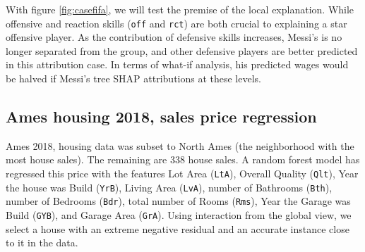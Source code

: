 \documentclass[
]{article}
\begin{document}
With figure \ref{fig:casefifa}, we will test the premise of the local explanation. While offensive and reaction skills (\texttt{off} and \texttt{rct}) are both crucial to explaining a star offensive player. As the contribution of defensive skills increases, Messi's is no longer separated from the group, and other defensive players are better predicted in this attribution case. In terms of what-if analysis, his predicted wages would be halved if Messi's tree SHAP attributions at these levels.

\hypertarget{ames-housing-2018-sales-price-regression}{%
\subsection{Ames housing 2018, sales price regression}\label{ames-housing-2018-sales-price-regression}}

Ames 2018, housing data was subset to North Ames (the neighborhood with the most house sales). The remaining are 338 house sales. A random forest model has regressed this price with the features Lot Area (\texttt{LtA}), Overall Quality (\texttt{Qlt}), Year the house was Build (\texttt{YrB}), Living Area (\texttt{LvA}), number of Bathrooms (\texttt{Bth}), number of Bedrooms (\texttt{Bdr}), total number of Rooms (\texttt{Rms}), Year the Garage was Build (\texttt{GYB}), and Garage Area (\texttt{GrA}). Using interaction from the global view, we select a house with an extreme negative residual and an accurate instance close to it in the data.
\end{document}
